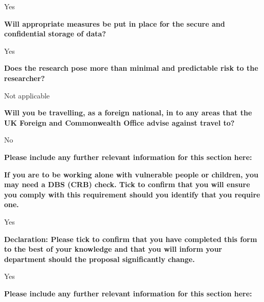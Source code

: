Yes

\textbf{Will appropriate measures be put in place for the secure and confidential storage of data?}

Yes

\textbf{Does the research pose more than minimal and predictable risk to the researcher?}

Not applicable

\textbf{Will you be travelling, as a foreign national, in to any areas that the UK Foreign and Commonwealth Office advise against travel to?}

No

\textbf{Please include any further relevant information for this section here:}

\textbf{If you are to be working alone with vulnerable people or children, you may need a DBS (CRB) check. Tick to confirm that you will ensure you comply with this requirement should you identify that you require one.}

Yes

\textbf{Declaration: Please tick to confirm that you have completed this form to the best of your knowledge and that you will inform your department should the proposal significantly change.}

Yes

\textbf{Please include any further relevant information for this section here:}
